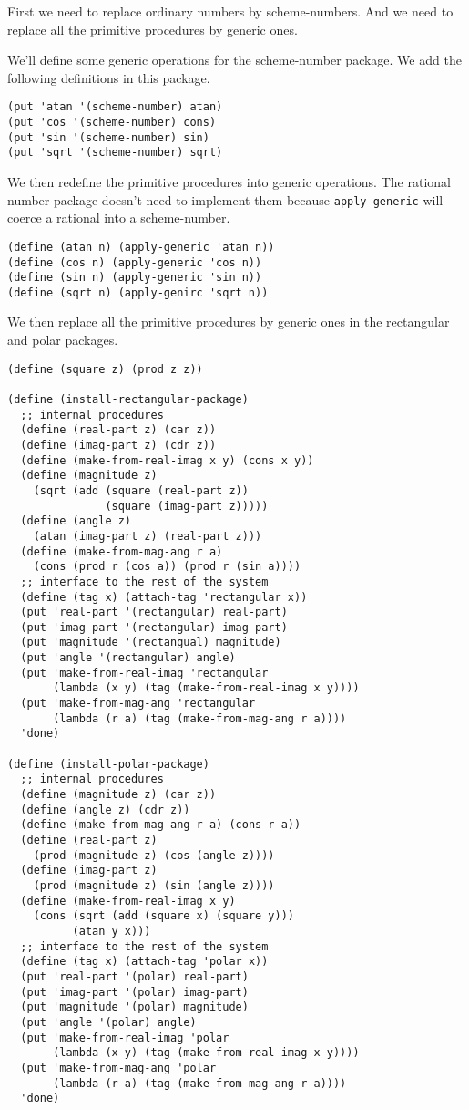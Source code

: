 \documentclass[a4paper,12pt]{article}
\begin{document}
First we need to replace ordinary numbers by scheme-numbers.  And we
need to replace all the primitive procedures by generic ones.

We'll define some generic operations for the scheme-number package.
We add the following definitions in this package.
\begin{lstlisting}
(put 'atan '(scheme-number) atan)
(put 'cos '(scheme-number) cons)
(put 'sin '(scheme-number) sin)
(put 'sqrt '(scheme-number) sqrt)
\end{lstlisting}
We then redefine the primitive procedures into generic operations.  The
rational number package doesn't need to implement them because
\lstinline!apply-generic! will coerce a rational into a scheme-number.
\begin{lstlisting}
(define (atan n) (apply-generic 'atan n))
(define (cos n) (apply-generic 'cos n))
(define (sin n) (apply-generic 'sin n))
(define (sqrt n) (apply-genirc 'sqrt n))  
\end{lstlisting}
We then replace all the primitive procedures by generic ones in the
rectangular and polar packages.
\begin{lstlisting}
(define (square z) (prod z z))
  
(define (install-rectangular-package)
  ;; internal procedures
  (define (real-part z) (car z))
  (define (imag-part z) (cdr z))
  (define (make-from-real-imag x y) (cons x y))
  (define (magnitude z)
    (sqrt (add (square (real-part z))
               (square (imag-part z)))))
  (define (angle z)
    (atan (imag-part z) (real-part z)))
  (define (make-from-mag-ang r a)
    (cons (prod r (cos a)) (prod r (sin a))))
  ;; interface to the rest of the system
  (define (tag x) (attach-tag 'rectangular x))
  (put 'real-part '(rectangular) real-part)
  (put 'imag-part '(rectangular) imag-part)
  (put 'magnitude '(rectangual) magnitude)
  (put 'angle '(rectangular) angle)
  (put 'make-from-real-imag 'rectangular
       (lambda (x y) (tag (make-from-real-imag x y))))
  (put 'make-from-mag-ang 'rectangular
       (lambda (r a) (tag (make-from-mag-ang r a))))
  'done)

(define (install-polar-package)
  ;; internal procedures
  (define (magnitude z) (car z))
  (define (angle z) (cdr z))
  (define (make-from-mag-ang r a) (cons r a))
  (define (real-part z)
    (prod (magnitude z) (cos (angle z))))
  (define (imag-part z)
    (prod (magnitude z) (sin (angle z))))
  (define (make-from-real-imag x y)
    (cons (sqrt (add (square x) (square y)))
          (atan y x)))
  ;; interface to the rest of the system
  (define (tag x) (attach-tag 'polar x))
  (put 'real-part '(polar) real-part)
  (put 'imag-part '(polar) imag-part)
  (put 'magnitude '(polar) magnitude)
  (put 'angle '(polar) angle)
  (put 'make-from-real-imag 'polar
       (lambda (x y) (tag (make-from-real-imag x y))))
  (put 'make-from-mag-ang 'polar
       (lambda (r a) (tag (make-from-mag-ang r a))))
  'done)
\end{lstlisting}
\end{document}
